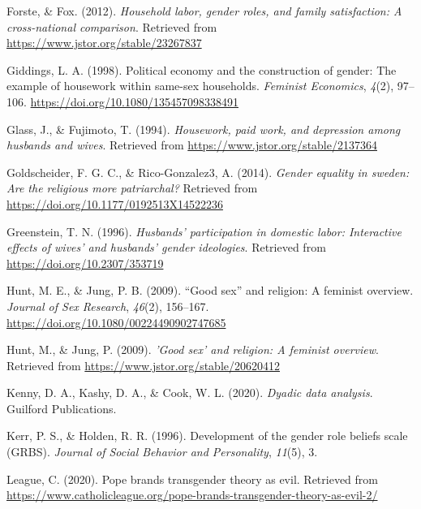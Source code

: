 \documentclass[
  man,floatsintext]{apa6}
\newlength{\cslhangindent}
\newlength{\cslentryspacingunit} %
\newenvironment{CSLReferences}[2] %
 {%
  \setlength{\parindent}{0pt}
  \ifodd #1
  \let\oldpar\par
  \def\par{\hangindent=\cslhangindent\oldpar}
  \fi
  \setlength{\parskip}{#2\cslentryspacingunit}
 }%
 {}
\begin{document}
\begin{CSLReferences}{1}{0}
\leavevmode{}%
Forste, \& Fox. (2012). \emph{Household labor, gender roles, and family satisfaction: A cross-national comparison}. Retrieved from \url{https://www.jstor.org/stable/23267837}

\leavevmode{}%
Giddings, L. A. (1998). Political economy and the construction of gender: The example of housework within same-sex households. \emph{Feminist Economics}, \emph{4}(2), 97--106. \url{https://doi.org/10.1080/135457098338491}

\leavevmode{}%
Glass, J., \& Fujimoto, T. (1994). \emph{Housework, paid work, and depression among husbands and wives}. Retrieved from \url{https://www.jstor.org/stable/2137364}

\leavevmode{}%
Goldscheider, F. G. C., \& Rico-Gonzalez3, A. (2014). \emph{Gender equality in sweden: Are the religious more patriarchal?} Retrieved from \url{https://doi.org/10.1177/0192513X14522236}

\leavevmode{}%
Greenstein, T. N. (1996). \emph{Husbands' participation in domestic labor: Interactive effects of wives' and husbands' gender ideologies}. Retrieved from \url{https://doi.org/10.2307/353719}

\leavevmode{}%
Hunt, M. E., \& Jung, P. B. (2009). {``Good sex''} and religion: A feminist overview. \emph{Journal of Sex Research}, \emph{46}(2), 156--167. \url{https://doi.org/10.1080/00224490902747685}

\leavevmode{}%
Hunt, M., \& Jung, P. (2009). \emph{'Good sex' and religion: A feminist overview}. Retrieved from \url{https://www.jstor.org/stable/20620412}

\leavevmode{}%
Kenny, D. A., Kashy, D. A., \& Cook, W. L. (2020). \emph{Dyadic data analysis}. Guilford Publications.

\leavevmode{}%
Kerr, P. S., \& Holden, R. R. (1996). Development of the gender role beliefs scale (GRBS). \emph{Journal of Social Behavior and Personality}, \emph{11}(5), 3.

\leavevmode{}%
League, C. (2020). Pope brands transgender theory as evil. Retrieved from \url{https://www.catholicleague.org/pope-brands-transgender-theory-as-evil-2/}


\end{CSLReferences}
\end{document}
